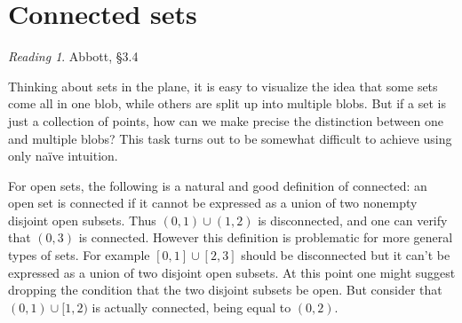 \documentclass[11pt,oneside]{amsbook}
\newcommand{\R}{\mathbb R}
\theoremstyle{definition}
\newtheorem{exerc}{Exercise}[section]
\theoremstyle{plain}
\theoremstyle{definition}
\theoremstyle{remark}
\newtheorem*{reading}{Reading}
\numberwithin{equation}{section}
\numberwithin{figure}{section}
\begin{document}
%
%

\newpage
\section{Connected sets}

\begin{reading}
  Abbott, \S 3.4
\end{reading}

Thinking about sets in the plane, it is easy to visualize the idea that some sets come all in one blob, while others are split up into multiple blobs. But if a set is just a collection of points, how can we make precise the distinction between one and multiple blobs? This task turns out to be somewhat difficult to achieve using only na\"ive intuition.

For open sets, the following is a natural and good definition of connected: an open set is connected if it cannot be expressed as a union of two nonempty disjoint open subsets. Thus $(0,1)\cup(1,2)$ is disconnected, and one can verify that $(0,3)$ is connected. However this definition is problematic for more general types of sets. For example $[0,1]\cup[2,3]$ should be disconnected but it can't be expressed as a union of two disjoint open subsets. At this point one might suggest dropping the condition that the two disjoint subsets be open. But consider that $(0,1)\cup[1,2)$ is actually connected, being equal to $(0,2)$.
\end{document}
